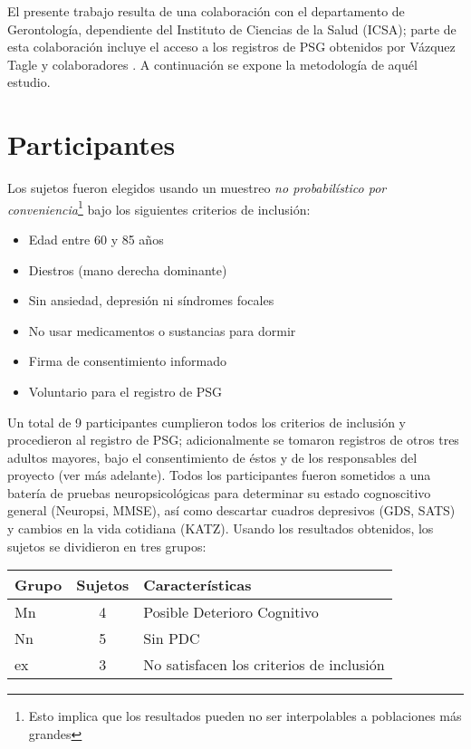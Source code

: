 El presente trabajo resulta de una colaboración con el departamento de Gerontología, dependiente 
del Instituto de Ciencias de la Salud (ICSA); parte de esta colaboración incluye el acceso a los 
registros de PSG obtenidos por Vázquez Tagle y colaboradores \cite{VazquezTagle16}. 
A continuación se expone la metodología de aquél estudio.%

\section{Participantes}

Los sujetos fueron elegidos usando un muestreo \textit{no probabilístico por 
conveniencia}\footnote{Esto implica que los resultados pueden  no ser interpolables a poblaciones 
más grandes} bajo los siguientes criterios de inclusión:
\begin{itemize}
\item Edad entre 60 y 85 años
\item Diestros (mano derecha dominante)
\item Sin ansiedad, depresión ni síndromes focales
\item No usar medicamentos o sustancias para dormir
\item Firma de consentimiento informado
\item Voluntario para el registro de PSG
\end{itemize}

Un total de 9 participantes cumplieron todos los criterios de inclusión y procedieron al registro 
de PSG; adicionalmente se tomaron registros de otros tres adultos mayores, bajo el consentimiento 
de éstos y de los responsables del proyecto (ver más adelante).
%
Todos los participantes fueron sometidos a una batería de pruebas neuropsicológicas para determinar
su estado cognoscitivo general (Neuropsi, MMSE), así como descartar cuadros depresivos (GDS, SATS) 
y cambios en la vida cotidiana (KATZ).
Usando los resultados obtenidos, los sujetos se dividieron en tres grupos:

\begin{table}[h]
\centering
\begin{tabular}{lcl}
\toprule
Grupo & Sujetos & Características \\
\midrule
Mn & 4 & Posible Deterioro Cognitivo \\
Nn & 5 & Sin PDC \\
ex & 3 & No satisfacen los criterios de inclusión \\
\bottomrule
\end{tabular}
\end{table}
%

